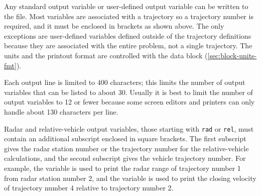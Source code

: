 Any standard output variable or user-defined output variable can be written to the
file. Most variables are associated with a trajectory so a trajectory number is
required, and it must be enclosed in brackets as shown above. The only exceptions
are user-defined variables defined outside of the trajectory definitions because they
are associated with the entire problem, not a single trajectory. The units and the
printout format are controlled with the  data block
(\cref{sec:block-units-fmt}).

Each output line is limited to 400 characters; this limits the number of output
variables that can be listed to about 30. Usually it is best to limit the number of
output variables to 12 or fewer because some screen editors and printers can only
handle about 130 characters per line.

Radar and relative-vehicle output variables, those starting with \texttt{rad} or
\texttt{rel}, must contain an additional subscript enclosed in square brackets. The
first subscript gives the radar station number or the trajectory number for the
relative-vehicle calculations, and the second subscript gives the vehicle trajectory
number. For example, the variable  is used to print the radar
range of trajectory number 1 from radar station number 2, and the variable
 is used to print the closing velocity of trajectory number 4
relative to trajectory number 2.
